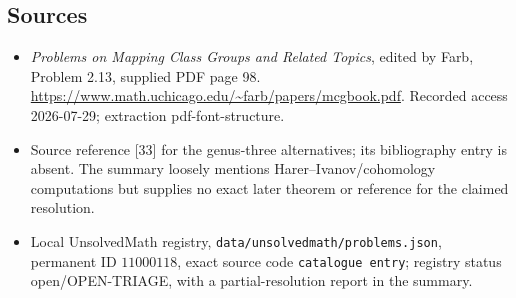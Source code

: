 \documentclass[11pt]{article}
\begin{document}
\subsection{Sources}
\begin{itemize}
\item \emph{Problems on Mapping Class Groups and Related Topics}, edited by Farb, Problem 2.13, supplied PDF page 98. \url{https://www.math.uchicago.edu/~farb/papers/mcgbook.pdf}. Recorded access 2026-07-29; extraction pdf-font-structure.
\item Source reference [33] for the genus-three alternatives; its bibliography entry is absent. The summary loosely mentions Harer--Ivanov/cohomology computations but supplies no exact later theorem or reference for the claimed resolution.
\item Local UnsolvedMath registry, \texttt{data/unsolvedmath/problems.json}, permanent ID \(11000118\), exact source code \texttt{catalogue entry}; registry status open/OPEN-TRIAGE, with a partial-resolution report in the summary.
\end{itemize}
\end{document}
